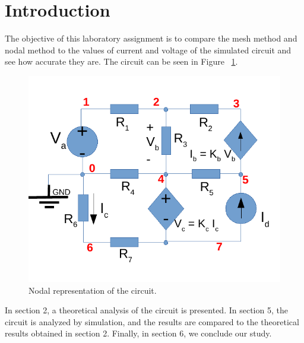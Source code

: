 \section{Introduction}
\label{sec:introduction}

The objective of this laboratory assignment is to compare the mesh method and nodal method to the values of current and voltage of the simulated circuit and see how accurate they are. The circuit can be seen in Figure ~\ref{fig:rc}. 

\begin{figure}[h] \centering
\includegraphics[width=0.6\linewidth]{rcm.pdf}
\caption{Nodal representation of the circuit.}
\label{fig:rc}
\end{figure}


In section 2, a theoretical analysis of the circuit is presented. In section 5, the circuit is analyzed by simulation, and the results are compared to the theoretical results obtained in section 2. Finally, in section 6, we conclude our study.


